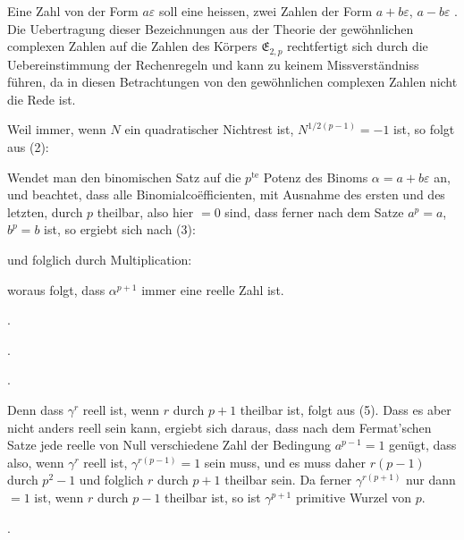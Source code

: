 
Eine Zahl von der Form $a\varepsilon$ soll eine 
 heissen, zwei Zahlen der Form $a+b\varepsilon$, $a-b\varepsilon$ 
. Die Uebertragung dieser Bezeichnungen
aus der Theorie der gewöhnlichen complexen Zahlen
auf die Zahlen des Körpers $\mathfrak{E}_{2,p}$ rechtfertigt sich durch die
Uebereinstimmung der Rechenregeln und kann zu keinem Missverständniss
führen, da in diesen Betrachtungen von den gewöhnlichen
complexen Zahlen nicht die Rede ist.

Weil immer, wenn $N$ ein quadratischer Nichtrest ist,
$N^{1/2(p-1)}=-1$ ist, so folgt aus (2):


Wendet man den binomischen Satz auf die $p^{\mathrm{te}}$ Potenz des
Binoms $\alpha=a+b\varepsilon$ an, und beachtet, dass alle Binomialco\"efficienten,
mit Ausnahme des ersten und des letzten, durch $p$
theilbar, also hier $=0$ sind, dass ferner nach dem 
Satze $a^p=a$, $b^p=b$ ist, so ergiebt sich nach (3):

und folglich durch Multiplication:

woraus folgt, dass $\alpha^{p+1}$ immer eine reelle Zahl ist.

.

.

.

Denn dass $\gamma^r$ reell ist, wenn $r$ durch $p+1$ theilbar ist,
folgt aus (5). Dass es aber nicht anders reell sein kann, ergiebt
sich daraus, dass nach dem Fermat'schen Satze jede reelle von
Null verschiedene Zahl der Bedingung $a^{p-1}=1$ genügt, dass
also, wenn $\gamma^r$ reell ist, $\gamma^{r(p-1)}=1$ sein muss, und es muss
daher $r(p-1)$ durch $p^2-1$ und folglich $r$ durch $p+1$ theilbar
sein. Da ferner $\gamma^{r(p+1)}$ nur dann $=1$ ist, wenn $r$ durch $p-1$
theilbar ist, so ist $\gamma^{p+1}$ primitive Wurzel von $p$.

.
